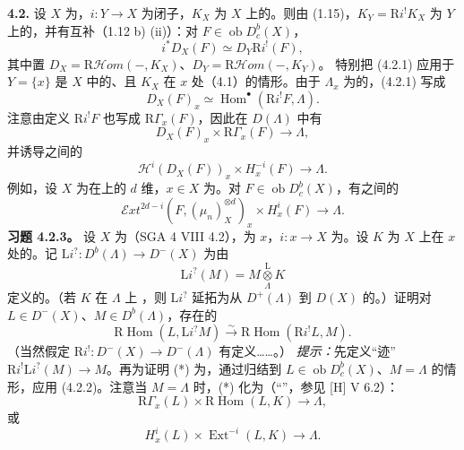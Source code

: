 \textbf{4.2.} 设 $X$ 为，$i:Y\to X$ 为闭子，$K_X$ 为 $X$ 上的。则由 (1.15)，$K_Y=\mathrm Ri^!K_X$ 为 $Y$ 上的，并有互补（1.12 b) (ii)）：对 $F\in\operatorname{ob}D_c^b(X)$，
\[
i^*D_X(F)\simeq D_Y\mathrm Ri^!(F),\tag{4.2.1}
\]
其中置 $D_X=\mathrm R\mathscr Hom(-,K_X)$、$D_Y=\mathrm R\mathscr Hom(-,K_Y)$。
特别把 (4.2.1) 应用于 $Y=\{x\}$ 是 $X$ 中的、且 $K_X$ 在 $x$ 处（4.1）的情形。由于 $\Lambda_x$ 为的，(4.2.1) 写成
\[
D_X(F)_x\simeq\operatorname{Hom}^{\bullet}(\mathrm Ri^!F,\Lambda).\tag{4.2.2}
\]
注意由定义 $\mathrm Ri^!F$ 也写成 $\mathrm R\Gamma_x(F)$，因此在 $D(\Lambda)$ 中有
\[
D_X(F)_x\times\mathrm R\Gamma_x(F)\longrightarrow\Lambda,\tag{4.2.2$'$}
\]
并诱导之间的
\[
\mathscr H^i(D_X(F))_x\times H_x^{-i}(F)\longrightarrow\Lambda.\tag{4.2.2$''$}
\]
例如，设 $X$ 为在上的 $d$ 维，$x\in X$ 为。对 $F\in\operatorname{ob}D_c^b(X)$，有之间的
\[
\mathscr Ext^{2d-i}(F,(\mu_n)_X^{\otimes d})_x\times H_x^i(F)\longrightarrow\Lambda.\tag{4.2.2$'''$}
\]
\textbf{习题 4.2.3。} 设 $X$ 为（SGA 4 VIII 4.2），为 $x$，$i:x\to X$ 为。设 $K$ 为 $X$ 上在 $x$ 处的。记 $\mathrm Li^?:D^b(\Lambda)\to D^-(X)$ 为由
\[\mathrm Li^?(M)=M\mathbin{\mathop\otimes\limits^{\mathrm L}_{\Lambda}}K\]
定义的。（若 $K$ 在 $\Lambda$ 上 ，则 $\mathrm Li^?$ 延拓为从 $D^+(\Lambda)$ 到 $D(X)$ 的。）证明对 $L\in D^-(X)$、$M\in D^b(\Lambda)$，存在的
\[
\mathrm R\operatorname{Hom}(L,\mathrm Li^?M)\xrightarrow\sim
\mathrm R\operatorname{Hom}(\mathrm Ri^!L,M).\tag{*}
\]
（当然假定 $\mathrm Ri^!:D^-(X)\to D^-(\Lambda)$ 有定义……。）
\emph{提示：}先定义“迹” $\mathrm Ri^!\mathrm Li^?(M)\to M$。再为证明 (*) 为，通过归结到 $L\in\operatorname{ob}D_c^b(X)$、$M=\Lambda$ 的情形，应用 (4.2.2)。注意当 $M=\Lambda$ 时，(*) 化为（“”，参见 [H] V 6.2）：
\[
\mathrm R\Gamma_x(L)\times\mathrm R\operatorname{Hom}(L,K)\longrightarrow\Lambda,
\]
或
\[H_x^i(L)\times\operatorname{Ext}^{-i}(L,K)\longrightarrow\Lambda.\]

